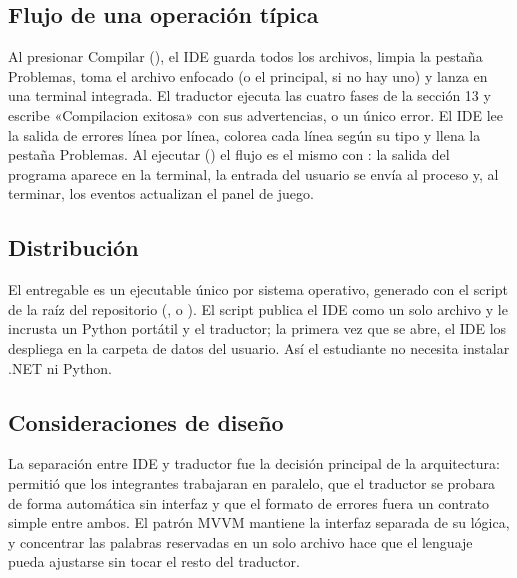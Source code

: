 \subsection{Flujo de una operación típica}

Al presionar Compilar (), el IDE guarda todos los archivos, limpia la pestaña Problemas, toma el archivo  enfocado (o el principal, si no hay uno) y lanza  en una terminal integrada. El traductor ejecuta las cuatro fases de la sección 13 y escribe «Compilacion exitosa» con sus advertencias, o un único error. El IDE lee la salida de errores línea por línea, colorea cada línea según su tipo y llena la pestaña Problemas. Al ejecutar () el flujo es el mismo con : la salida del programa aparece en la terminal, la entrada del usuario se envía al proceso y, al terminar, los eventos  actualizan el panel de juego.

\subsection{Distribución}

El entregable es un ejecutable único por sistema operativo, generado con el script  de la raíz del repositorio (,  o ). El script publica el IDE como un solo archivo y le incrusta un Python portátil y el traductor; la primera vez que se abre, el IDE los despliega en la carpeta de datos del usuario. Así el estudiante no necesita instalar .NET ni Python.

\subsection{Consideraciones de diseño}

La separación entre IDE y traductor fue la decisión principal de la arquitectura: permitió que los integrantes trabajaran en paralelo, que el traductor se probara de forma automática sin interfaz y que el formato de errores fuera un contrato simple entre ambos. El patrón MVVM mantiene la interfaz separada de su lógica, y concentrar las palabras reservadas en un solo archivo hace que el lenguaje pueda ajustarse sin tocar el resto del traductor.

\newpage

